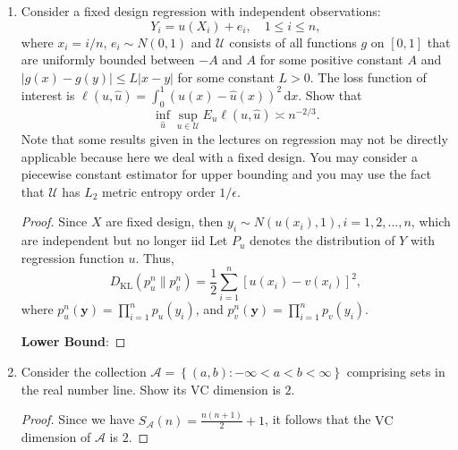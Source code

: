 \begin{enumerate}
	\item Consider a fixed design regression with independent observations:
	      \begin{equation*}
		      Y_{i}=u\left(X_{i}\right)+e_{i},\quad 1\leq i\leq n,
	      \end{equation*}
	      where \(x_{i}=i/n\), \(e_{i}\sim N(0,1)\) and \(\mathcal{U}\) consists of all functions \(g\) on \([0,1]\) that are uniformly bounded between \(-A\) and \(A\) for some positive constant \(A\) and \(|g(x)-g(y)|\leq L|x-y|\) for some constant \(L>0\). The loss function of interest is \(\ell(u,\hat{u})=\int_{0}^{1}(u(x)-\hat{u}(x))^{2}\,\mathrm{d}x\). Show that
	      \begin{equation*}
		      \inf_{\hat{u}}\sup_{u\in\mathcal{U}}E_{u}\ell(u,\hat{u})\asymp n^{-2/3}.
	      \end{equation*}
	      Note that some results given in the lectures on regression may not be directly applicable because here we deal with a fixed design. You may consider a piecewise constant estimator for upper bounding and you may use the fact that \(\mathcal{U}\) has \(L_{2}\) metric entropy order \(1/\epsilon\).
	      \begin{proof}
		      Since \(X\) are fixed design, then \(y_{i}\sim N(u(x_{i}),1), i=1,2,\ldots,n\), which are independent but no longer iid  Let \(P_{u}\) denotes the distribution of \(Y\) with regression function \(u\). Thus,
		      \begin{equation*}
			      D_{\text{KL}}\left(p_{u}^{n}\|p_{v}^{n}\right)=\frac{1}{2}\sum_{i=1}^{n}\left[u(x_{i})-v(x_{i})\right]^{2},
		      \end{equation*}
		      where \(p_{u}^{n}(\mathbf{y})=\prod_{i=1}^{n}p_{u}(y_{i})\), and \(p_{v}^{n}(\mathbf{y})=\prod_{i=1}^{n}p_{v}(y_{i})\).

		      \textbf{Lower Bound}:
	      \end{proof}
	\item Consider the collection \(\mathcal{A}=\left\{(a,b):-\infty<a<b<\infty\right\}\) comprising sets in the real number line. Show its \(\mathrm{VC}\) dimension is \(2\).
	      \begin{proof}
		      Since we have \(S_{\mathcal{A}}(n)=\frac{n(n+1)}{2}+1\), it follows that the \(\mathrm{VC}\) dimension of \(\mathcal{A}\) is \(2\).
	      \end{proof}
\end{enumerate}
